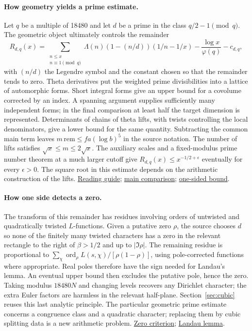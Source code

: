 \documentclass[10pt,letterpaper]{article}
\newcommand{\repo}[2]{\href{https://github.com/lsernau/grh-lean/blob/72fead102f663d5c7a407964a13dc0cf9d977207/grh/#1}{#2}}
\begin{document}
\paragraph{How geometry yields a prime estimate.}
Let $q$ be a multiple of 18480 and let $d$ be a prime in the class
$q/2-1\pmod q$. The geometric object ultimately controls the remainder
\[
 R_{d,q}(x)=\sum_{\substack{n\le x\\n\equiv1\pmod q}}
  \Lambda(n)(1-(n/d))(1/n-1/x)-\frac{\log x}{\varphi(q)}-c_{d,q},
\]
with $(n/d)$ the Legendre symbol and the constant chosen so that the remainder
tends to zero. Theta derivatives put the weighted prime divisibilities into
a lattice of automorphic forms. Short integral forms give an upper bound for
a covolume corrected by an index. A spanning argument supplies sufficiently
many independent forms; in the final comparison at least half the target
dimension is represented. Determinants of chains of theta lifts, with
twists controlling the local denominators, give a lower bound for the same
quantity. Subtracting the common main term leaves
$m\,\mathrm{rem}\le f a(\log b)^5$ in the source notation.
The number of lifts satisfies $\sqrt x\le m\le2\sqrt x$.
The auxiliary scales and a fixed-modulus prime number theorem at a much larger
cutoff give $R_{d,q}(x)\le x^{-1/2+\epsilon}$ eventually for every
$\epsilon>0$. The square root in this estimate depends on the arithmetic
construction of the lifts.
\repo{GUIDE.md}{Reading guide};
\repo{src/New/Reduction/MainInequality.lean}{main comparison};
\repo{src/New/Reduction/OneSidedBound.lean}{one-sided bound}.

\paragraph{How one side detects a zero.}
The transform of this remainder has residues involving orders of untwisted
and quadratically twisted $L$-functions. Given a putative zero $\rho$, the
source chooses $d$ so none of the finitely many twisted characters has a zero
in the relevant rectangle to the right of $\beta>1/2$ and up to
$|\Im\rho|$. The remaining residue is proportional to
$\sum_\chi \operatorname{ord}_\rho L(s,\chi)/[\rho(1-\rho)]$, using
pole-corrected functions where appropriate. Real poles therefore have the
sign needed for Landau's lemma. An eventual upper bound then excludes the
putative pole, hence the zero. Taking modulus $18480N$ and changing levels
recovers any Dirichlet character; the extra Euler factors are harmless in
the relevant half-plane. Section~\ref{sec:cubic} reuses this last analytic
principle. The particular geometric prime estimate concerns a congruence class
and a quadratic character; replacing them by cubic splitting data is a new
arithmetic problem.
\repo{src/New/Reduction/Zeros/Criterion.lean}{Zero criterion};
\repo{src/Lib/Analytic/Landau.lean}{Landau lemma}.
\end{document}
